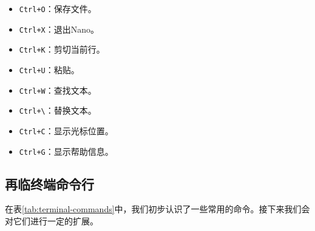 \begin{multicols}{2}
  \begin{itemize}
    \item \texttt{Ctrl+O}：保存文件。
    \item \texttt{Ctrl+X}：退出Nano。
    \item \texttt{Ctrl+K}：剪切当前行。
    \item \texttt{Ctrl+U}：粘贴。
    \item \texttt{Ctrl+W}：查找文本。
    \item \texttt{Ctrl+\textbackslash}：替换文本。
    \item \texttt{Ctrl+C}：显示光标位置。
    \item \texttt{Ctrl+G}：显示帮助信息。
  \end{itemize}
\end{multicols}

\subsection{再临终端命令行}

在表\ref{tab:terminal-commands}中，我们初步认识了一些常用的命令。接下来我们会对它们进行一定的扩展。

